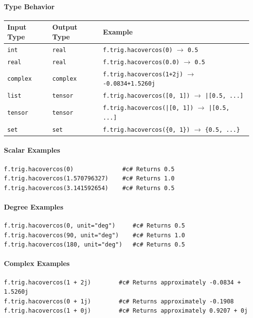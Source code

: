 \paragraph{Type Behavior}
\begin{center}
\begin{tabular}{lll}
\textbf{Input Type} & \textbf{Output Type} & \textbf{Example} \\ \hline
\texttt{int} & \texttt{real} & \texttt{f.trig.hacovercos(0)} $\to$ \texttt{0.5} \\
\texttt{real} & \texttt{real} & \texttt{f.trig.hacovercos(0.0)} $\to$ \texttt{0.5} \\
\texttt{complex} & \texttt{complex} & \texttt{f.trig.hacovercos(1+2j)} $\to$ \texttt{-0.0834+1.5260j} \\
\texttt{list} & \texttt{tensor} & \texttt{f.trig.hacovercos([0, 1])} $\to$ \texttt{|[0.5, ...]} \\
\texttt{tensor} & \texttt{tensor} & \texttt{f.trig.hacovercos(|[0, 1])} $\to$ \texttt{|[0.5, ...]} \\
\texttt{set} & \texttt{set} & \texttt{f.trig.hacovercos(\{0, 1\})} $\to$ \texttt{\{0.5, ...\}} \\
\end{tabular}
\end{center}

\paragraph{Scalar Examples}
\begin{verbatim}
f.trig.hacovercos(0)              #c# Returns 0.5
f.trig.hacovercos(1.570796327)    #c# Returns 1.0
f.trig.hacovercos(3.141592654)    #c# Returns 0.5
\end{verbatim}

\paragraph{Degree Examples}
\begin{verbatim}
f.trig.hacovercos(0, unit="deg")     #c# Returns 0.5
f.trig.hacovercos(90, unit="deg")    #c# Returns 1.0
f.trig.hacovercos(180, unit="deg")   #c# Returns 0.5
\end{verbatim}

\paragraph{Complex Examples}
\begin{verbatim}
f.trig.hacovercos(1 + 2j)        #c# Returns approximately -0.0834 + 1.5260j
f.trig.hacovercos(0 + 1j)        #c# Returns approximately -0.1908
f.trig.hacovercos(1 + 0j)        #c# Returns approximately 0.9207 + 0j
\end{verbatim}

